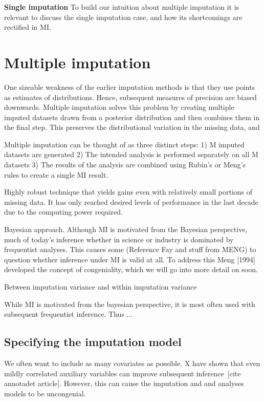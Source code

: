 \documentclass{article}
\begin{document}
	\textbf{Single imputation}
	To build our intuition about multiple imputation it is relevant to discuss the single imputation case, and how its shortcomings are rectified in MI.
	
	\section{Multiple imputation}
	One sizeable weakness of the earlier imputation methods is that they use points as estimates of distributions. Hence, subsequent measures of precision are biased downwards. Multiple imputation solves this problem by creating multiple imputed datasets drawn from a posterior distribution and then combines them in the final step. This preserves the distributional variation in the missing data, and 

	
	
	Multiple imputation can be thought of as three distinct steps:
	1) M imputed datasets are generated
	2) The intended analysis is performed separately on all M datasets
	3) The results of the analysis are combined using Rubin's or Meng's rules to create a single MI result.
	
	Highly robust technique that yields gains even with relatively small portions of missing data. It has only reached desired levels of performance in the last decade due to the computing power required. 
	
	Bayesian approach. Although MI is motivated from the Bayesian perspective, much of today's inference whether in science or industry is dominated by frequentist analyses. This causes some (Reference Fay and stuff from MENG) to question whether inference under MI is valid at all. To address this Meng [1994] developed the concept of congeniality, which we will go into more detail on soon.
	
	Between imputation variance and within imputation variance
	
	
	While MI is motivated from the bayesian perspective, it is most often used with subsequent frequentist inference. Thus ...
	
	\subsection{Specifying the imputation model}
	
	
	We often want to include as many covariates as possible. X have shown that even mildly correlated auxiliary variables can improve subsequent inference [cite annotadet article]. However, this can cause the imputation and and analyses models to be uncongenial.
	
\end{document}
